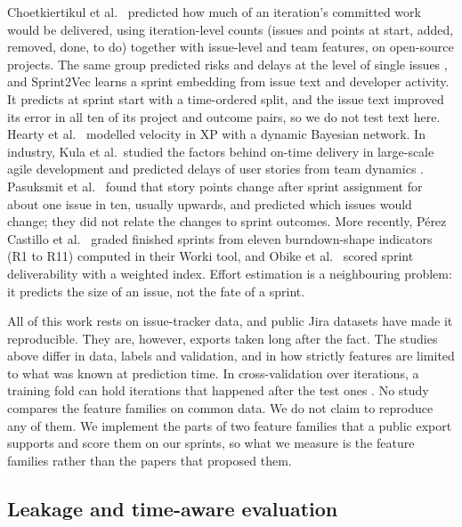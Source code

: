 Choetkiertikul et al.\ \cite{choet2018} predicted how much of an iteration's committed work would be delivered, using iteration-level counts (issues and points at start, added, removed, done, to do) together with issue-level and team features, on open-source projects. The same group predicted risks and delays at the level of single issues \cite{choet2015,choet2017}, and Sprint2Vec \cite{sprint2vec} learns a sprint embedding from issue text and developer activity. It predicts at sprint start with a time-ordered split, and the issue text improved its error in all ten of its project and outcome pairs, so we do not test text here. Hearty et al.\ \cite{hearty2009} modelled velocity in XP with a dynamic Bayesian network. In industry, Kula et al.\ studied the factors behind on-time delivery in large-scale agile development \cite{kula2022} and predicted delays of user stories from team dynamics \cite{kula2021}. Pasuksmit et al.\ \cite{pasuksmit2022} found that story points change after sprint assignment for about one issue in ten, usually upwards, and predicted which issues would change; they did not relate the changes to sprint outcomes. More recently, P\'erez Castillo et al.\ \cite{perez2024} graded finished sprints from eleven burndown-shape indicators (R1 to R11) computed in their Worki tool, and Obike et al.\ \cite{obike2025} scored sprint deliverability with a weighted index. Effort estimation \cite{choet2019,porru2016,fu2023,tawosi2023} is a neighbouring problem: it predicts the size of an issue, not the fate of a sprint.

All of this work rests on issue-tracker data, and public Jira datasets \cite{tawos,ortu2015,montgomery2022} have made it reproducible. They are, however, exports taken long after the fact. The studies above differ in data, labels and validation, and in how strictly features are limited to what was known at prediction time. In cross-validation over iterations, a training fold can hold iterations that happened after the test ones \cite{choet2018}. No study compares the feature families on common data. We do not claim to reproduce any of them. We implement the parts of two feature families that a public export supports and score them on our sprints, so what we measure is the feature families rather than the papers that proposed them.

\subsection{Leakage and time-aware evaluation}


